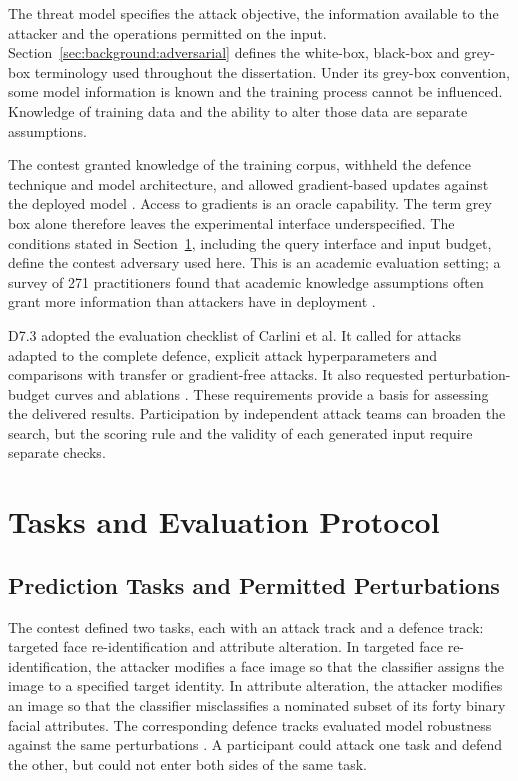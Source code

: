 The threat model specifies the attack objective, the information available to the attacker and
the operations permitted on the input. Section~\ref{sec:background:adversarial} defines the
white-box, black-box and grey-box terminology used throughout the dissertation. Under its
grey-box convention, some model information is known and the training process cannot be
influenced. Knowledge of training data and the ability to alter those data are separate
assumptions.

The contest granted knowledge of the training corpus, withheld the defence technique and model
architecture, and allowed gradient-based updates against the deployed model
\cite{sparta2021d73, norouzian2021safaircontest}. Access to gradients is an oracle capability.
The term grey box alone therefore leaves the experimental interface underspecified. The
conditions stated in Section~\ref{sec:advml:4}, including the query interface and input budget,
define the contest adversary used here. This is an academic evaluation setting; a survey of
271 practitioners found that academic knowledge assumptions often grant more information than
attackers have in deployment \cite{grosse2024towards}.

D7.3 adopted the evaluation checklist of Carlini et al. It called for attacks adapted to the
complete defence, explicit attack hyperparameters and comparisons with transfer or
gradient-free attacks. It also requested perturbation-budget curves and ablations
\cite{sparta2021d73, carlini2019evaluating}. These requirements provide a basis for assessing
the delivered results. Participation by independent attack teams can broaden the search, but
the scoring rule and the validity of each generated input require separate checks.

\section{Tasks and Evaluation Protocol}
\label{sec:advml:4}

\subsection{Prediction Tasks and Permitted Perturbations}

The contest defined two tasks, each with an attack track and a defence track: targeted face
re-identification and attribute alteration. In targeted face re-identification, the attacker
modifies a face image so that the classifier assigns the image to a specified target identity. In
attribute alteration, the attacker modifies an image so that the classifier misclassifies a
nominated subset of its forty binary facial attributes. The corresponding defence tracks
evaluated model robustness against the same perturbations \cite{sparta2021d73}. A
participant could attack one task and defend the other, but could not enter both sides of the
same task.

